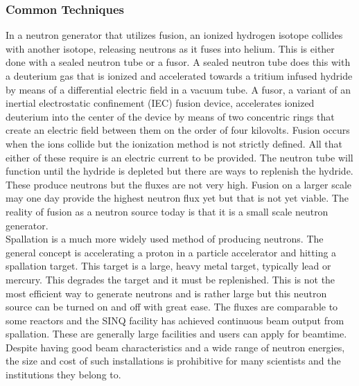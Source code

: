 \subsubsection{Common Techniques}
In a neutron generator that utilizes fusion, an ionized hydrogen isotope collides with another isotope, releasing neutrons as it fuses into helium. This is either done with a sealed neutron tube or a fusor. A sealed neutron tube does this with a deuterium gas that is ionized and accelerated towards a tritium infused hydride by means of a differential electric field in a vacuum tube. A fusor, a variant of an inertial electrostatic confinement (IEC) fusion device, accelerates ionized deuterium into the center of the device by means of two concentric rings that create an electric field between them on the order of four kilovolts. Fusion occurs when the ions collide but the ionization method is not strictly defined. All that either of these require is an electric current to be provided. The neutron tube will function until the hydride is depleted but there are ways to replenish the hydride. These produce neutrons but the fluxes are not very high. Fusion on a larger scale may one day provide the highest neutron flux yet but that is not yet viable. The reality of fusion as a neutron source today is that it is a small scale neutron generator.\\
Spallation is a much more widely used method of producing neutrons. The general concept is accelerating a proton in a particle accelerator and hitting a spallation target. This target is a large, heavy metal target, typically lead or mercury. This degrades the target and it must be replenished. This is not the most efficient way to generate neutrons and is rather large but this neutron source can be turned on and off with great ease. The fluxes are comparable to some reactors and the SINQ facility has achieved continuous beam output from spallation. These are generally large facilities and users can apply for beamtime. Despite having good beam characteristics and a wide range of neutron energies, the size and cost of such installations is prohibitive for many scientists and the institutions they belong to.\\
